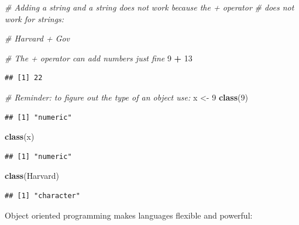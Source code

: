 \documentclass[
]{book}
\newenvironment{Shaded}{\begin{snugshade}}{\end{snugshade}}
\newcommand{\CommentTok}[1]{\textcolor[rgb]{0.56,0.35,0.01}{\textit{#1}}}
\newcommand{\DecValTok}[1]{\textcolor[rgb]{0.00,0.00,0.81}{#1}}
\newcommand{\KeywordTok}[1]{\textcolor[rgb]{0.13,0.29,0.53}{\textbf{#1}}}
\newcommand{\NormalTok}[1]{#1}
\newcommand{\OperatorTok}[1]{\textcolor[rgb]{0.81,0.36,0.00}{\textbf{#1}}}
\newcommand{\StringTok}[1]{\textcolor[rgb]{0.31,0.60,0.02}{#1}}
\theoremstyle{definition}
\theoremstyle{definition}
\theoremstyle{definition}
\theoremstyle{remark}
\begin{document}
\begin{Shaded}
\begin{Highlighting}[]
\CommentTok{\# Adding a string and a string does not work because the \textquotesingle{}+\textquotesingle{} operator }
\CommentTok{\# does not work for strings:}

\CommentTok{\# \textquotesingle{}Harvard\textquotesingle{} + \textquotesingle{}Gov\textquotesingle{}}

\CommentTok{\# The \textquotesingle{}+\textquotesingle{} operator can add numbers just fine}
\DecValTok{9} \OperatorTok{+}\StringTok{ }\DecValTok{13}
\end{Highlighting}
\end{Shaded}

\begin{verbatim}
## [1] 22
\end{verbatim}

\begin{Shaded}
\begin{Highlighting}[]
\CommentTok{\# Reminder: to figure out the type of an object use:}
\NormalTok{x <{-}}\StringTok{ }\DecValTok{9}
\KeywordTok{class}\NormalTok{(}\DecValTok{9}\NormalTok{)}
\end{Highlighting}
\end{Shaded}

\begin{verbatim}
## [1] "numeric"
\end{verbatim}

\begin{Shaded}
\begin{Highlighting}[]
\KeywordTok{class}\NormalTok{(x)}
\end{Highlighting}
\end{Shaded}

\begin{verbatim}
## [1] "numeric"
\end{verbatim}

\begin{Shaded}
\begin{Highlighting}[]
\KeywordTok{class}\NormalTok{(}\StringTok{\textquotesingle{}Harvard\textquotesingle{}}\NormalTok{)}
\end{Highlighting}
\end{Shaded}

\begin{verbatim}
## [1] "character"
\end{verbatim}

Object oriented programming makes languages flexible and powerful:
\end{document}
